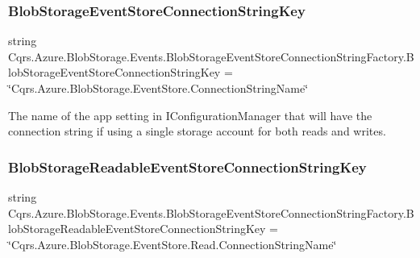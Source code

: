 \subsubsection{\texorpdfstring{Blob\+Storage\+Event\+Store\+Connection\+String\+Key}{BlobStorageEventStoreConnectionStringKey}}
{\footnotesize\ttfamily string Cqrs.\+Azure.\+Blob\+Storage.\+Events.\+Blob\+Storage\+Event\+Store\+Connection\+String\+Factory.\+Blob\+Storage\+Event\+Store\+Connection\+String\+Key = \char`\"{}Cqrs.\+Azure.\+Blob\+Storage.\+Event\+Store.\+Connection\+String\+Name\char`\"{}\hspace{0.3cm}{\ttfamily [static]}}



The name of the app setting in I\+Configuration\+Manager that will have the connection string if using a single storage account for both reads and writes. 

\mbox{\label{classCqrs_1_1Azure_1_1BlobStorage_1_1Events_1_1BlobStorageEventStoreConnectionStringFactory_a2b233edf7ad4cbc29872757006319527_a2b233edf7ad4cbc29872757006319527}} 
\subsubsection{\texorpdfstring{Blob\+Storage\+Readable\+Event\+Store\+Connection\+String\+Key}{BlobStorageReadableEventStoreConnectionStringKey}}
{\footnotesize\ttfamily string Cqrs.\+Azure.\+Blob\+Storage.\+Events.\+Blob\+Storage\+Event\+Store\+Connection\+String\+Factory.\+Blob\+Storage\+Readable\+Event\+Store\+Connection\+String\+Key = \char`\"{}Cqrs.\+Azure.\+Blob\+Storage.\+Event\+Store.\+Read.\+Connection\+String\+Name\char`\"{}\hspace{0.3cm}{\ttfamily [static]}}



